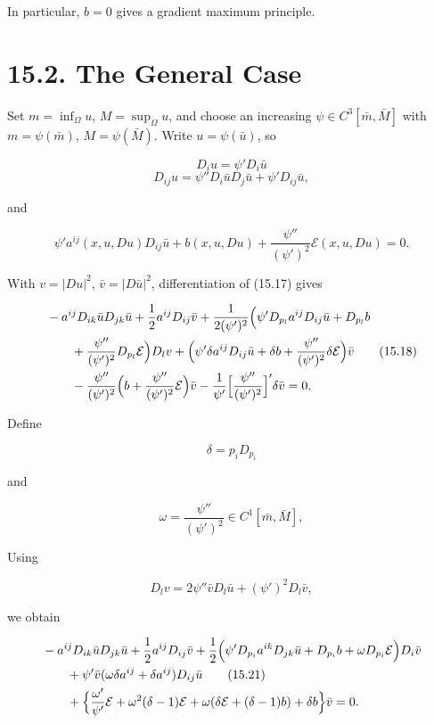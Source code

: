 In particular, \(b=0\) gives a gradient maximum principle.

\bigskip

\section*{15.2. The General Case}

\medskip

Set \(m=\inf_\Omega u\), \(M=\sup_\Omega u\), and choose an increasing
\(\psi\in C^3[\bar m,\bar M]\) with \(m=\psi(\bar m)\), \(M=\psi(\bar M)\).
Write \(u=\psi(\bar u)\), so

\[
D_i u=\psi' D_i \bar u
\]
\[
D_{ij}u=\psi'' D_i \bar u D_j \bar u+\psi' D_{ij}\bar u,
\]

and

\begin{equation}
\psi' a^{ij}(x,u,Du)D_{ij}\bar u+b(x,u,Du)+\frac{\psi''}{(\psi')^2}\mathcal E(x,u,Du)=0.
\tag{15.17}
\end{equation}

With \(v=|Du|^2\), \(\bar v=|D\bar u|^2\), differentiation of (15.17) gives

\begin{align}
&-a^{ij}D_{ik}\bar u D_{jk}\bar u+\frac12 a^{ij}D_{ij}\bar v+\frac{1}{2(\psi')^2}\Bigl(\psi' D_{p_l}a^{ij}D_{ij}\bar u+D_{p_l}b
\notag\\
&\qquad+\frac{\psi''}{(\psi')^2}D_{p_l}\mathcal E\Bigr)D_l v+\Bigl(\psi' \delta a^{ij}D_{ij}\bar u+\delta b+\frac{\psi''}{(\psi')^2}\delta \mathcal E\Bigr)\bar v
\tag{15.18}\\
&\qquad-\frac{\psi''}{(\psi')^2}\Bigl(b+\frac{\psi''}{(\psi')^2}\mathcal E\Bigr)\bar v-\frac{1}{\psi'}\Bigl[\frac{\psi''}{(\psi')^2}\Bigr]'\delta \bar v=0.
\notag
\end{align}

Define

\begin{equation}
\delta=p_iD_{p_i}
\tag{15.19}
\end{equation}

and

\begin{equation}
\omega=\frac{\psi''}{(\psi')^2}\in C^1[\bar m,\bar M],
\tag{15.20}
\end{equation}

Using

\[
D_l v=2\psi''\bar v D_l\bar u+(\psi')^2D_l\bar v,
\]

we obtain

\begin{align}
&-a^{ij}D_{ik}\bar u D_{jk}\bar u+\frac12 a^{ij}D_{ij}\bar v+\frac12\Bigl(\psi' D_{p_i}a^{ik}D_{jk}\bar u+D_{p_i}b+\omega D_{p_i}\mathcal E\Bigr)D_i \bar v
\notag\\
&\qquad+\psi'\bar v(\omega \delta a^{ij}+\delta a^{ij})D_{ij}\bar u
\tag{15.21}\\
&\qquad+\Bigl\{\frac{\omega'}{\psi'}\mathcal E+\omega^2(\delta-1)\mathcal E+\omega(\delta \mathcal E+(\delta-1)b)+\delta b\Bigr\}\bar v=0.
\notag
\end{align}

